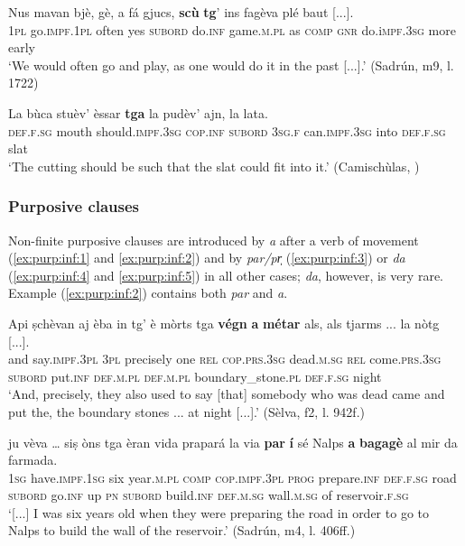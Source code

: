 \ea
\label{ex:manncl3}
\gll Nus mavan bjè, gè, a fá gjucs, \textbf{scù} \textbf{tg}’ ins fagèva plé baut [...].   \\
\textsc{1pl} go.\textsc{impf.1pl} often yes \textsc{subord} do.\textsc{inf} game.\textsc{m.pl} as \textsc{comp} \textsc{gnr} do.i\textsc{mpf.3sg} more early\\
\glt `We would often go and play, as one would do it in the past [...].' (Sadrún, m9, l. 1722)
\z

\ea
\label{ex:manncl4}
\gll   La bùca stuèv' èssar \textbf{tga} la pudèv' ajn, la lata.\\
\textsc{def.f.sg} mouth should.\textsc{impf.3sg} \textsc{cop.inf} \textsc{subord} \textsc{3sg.f} can.\textsc{impf.3sg} into \textsc{def.f.sg} slat\\
\glt `The cutting should be such that the slat could fit into it.' (Camischùlas, )
\z

\subsubsection{Purposive clauses}
Non-finite purposive clauses are introduced by \textit{a} after a verb of movement (\ref{ex:purp:inf:1} and \ref{ex:purp:inf:2}) and by \textit{par/pr̩} (\ref{ex:purp:inf:3}) or \textit{da} (\ref{ex:purp:inf:4} and \ref{ex:purp:inf:5}) in all other cases; \textit{da}, however, is very rare. Example (\ref{ex:purp:inf:2}) contains both \textit{par} and \textit{a}.

\ea\label{ex:purp:inf:1}
\gll  Api ṣchèvan aj èba in tg’ è mòrts tga \textbf{végn} \textbf{a} \textbf{métar} als, als tjarms ... la nòtg [...].\\
and say.\textsc{impf.3pl} \textsc{3pl} precisely one \textsc{rel} \textsc{cop.prs.3sg} dead.\textsc{m.sg} \textsc{rel} come.\textsc{prs.3sg} \textsc{subord} put.\textsc{inf} \textsc{def.m.pl} \textsc{def.m.pl} boundary\_stone.\textsc{pl} {} \textsc{def.f.sg} night \\
\glt `And, precisely, they also used to say [that] somebody who was dead came and put the, the boundary stones ... at night [...].' (Sèlva, f2, l. 942f.)
\z

\ea
\label{ex:purp:inf:2}
\gll [...] ju vèva … siṣ òns tga èran vida prapará la via \textbf{par} \textbf{í} sé Nalps \textbf{a} \textbf{bagagè} al mir da farmada.\\
{} \textsc{1sg} have.\textsc{impf.1sg} {} six year.\textsc{m.pl} \textsc{comp} \textsc{cop.impf.3pl} \textsc{prog} prepare.\textsc{inf} \textsc{def.f.sg} road \textsc{subord} go.\textsc{inf} up \textsc{pn} \textsc{subord} build.\textsc{inf} \textsc{def.m.sg} wall.\textsc{m.sg} of reservoir.\textsc{f.sg} \\ 
\glt `[...] I was six years old when they were preparing the road in order to go to Nalps to build the wall of the reservoir.' (Sadrún, m4, l. 406ff.)
\z

